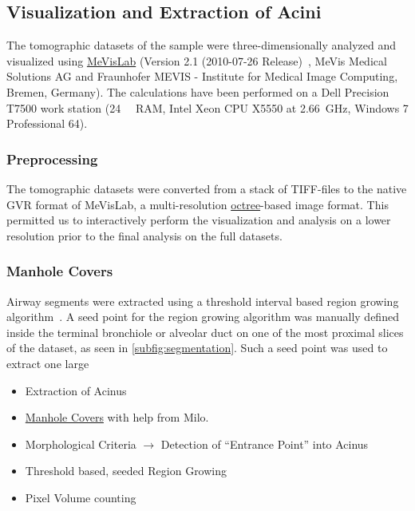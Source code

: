 \documentclass[%
	paper=a4,%
	twoside=true,%
	draft=false,%
	abstract=false]{scrartcl}
\begin{document}
\subsection{Visualization and Extraction of Acini}
The tomographic datasets of the sample were three-dimensionally analyzed and visualized using \href{http://mevislab.de}{MeVisLab} (Version 2.1 (2010-07-26 Release)~\cite{Bitter2007}, MeVis Medical Solutions AG and Fraunhofer MEVIS - Institute for Medical Image Computing, Bremen, Germany). The calculations have been performed on a Dell Precision T7500 work station (\SI{24}{\giga\byte} RAM, Intel Xeon CPU X5550 at \SI{2.66}{\giga\hertz}, Windows 7 Professional \SI{64}{\bit}).

\subsubsection{Preprocessing}
The tomographic datasets were converted from a stack of TIFF-files to the native GVR format of MeVisLab, a multi-resolution \href{https://secure.wikimedia.org/wikipedia/en/w/index.php?title=Octree&oldid=409131920}{octree}-based image format. This permitted us to interactively perform the visualization and analysis on a lower resolution prior to the final analysis on the full datasets.

\subsubsection{Manhole Covers}
Airway segments were extracted using a threshold interval based region growing algorithm~\cite{Zucker1976}. A seed point for the region growing algorithm was manually defined inside the terminal bronchiole or alveolar duct on one of the most proximal slices of the dataset, as seen in \autoref{subfig:segmentation}. Such a seed point was used to extract one large  

\begin{itemize}
	\item Extraction of Acinus
	\item \href{http://www.mevis-research.de/cgi-bin/discus/board-auth.cgi?lm=1282233250&file=/839/11760.html}{Manhole Covers} with help from Milo.
	\item Morphological Criteria $\rightarrow$ Detection of “Entrance Point” into Acinus
	\item Threshold based, seeded Region Growing
	\item Pixel Volume counting
\end{itemize}
\end{document}

